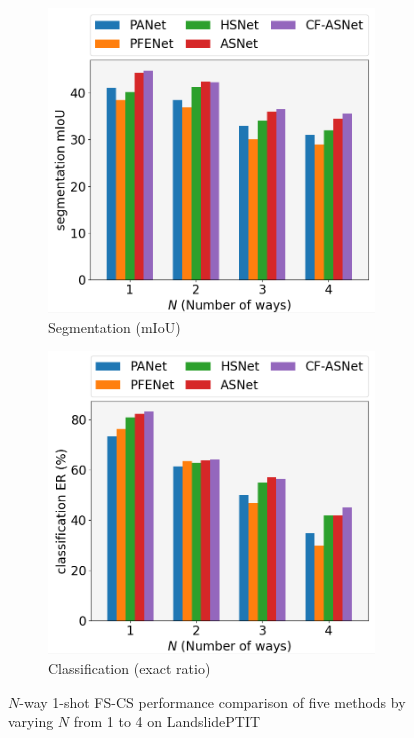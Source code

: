 \documentclass{ieeeaccess}
\begin{document}
\begin{figure}
  \begin{subfigure}{\columnwidth}
  \includegraphics[width=0.95\textwidth]{Fig/4way_iou_2.png}
  \caption{Segmentation (mIoU)}
  \label{fig:compare-way-a}
  \end{subfigure}
  \hfill
  \begin{subfigure}{\columnwidth}
  \includegraphics[width=0.95\textwidth]{Fig/4way_er_2.png}
  \caption{Classification (exact ratio)}
  \label{fig:compare-way-b}
  \end{subfigure}
  \caption{$N$-way 1-shot FS-CS performance comparison of five
methods by varying $N$ from 1 to 4 on LandslidePTIT}
  \label{fig:compare-way}
\end{figure}
\end{document}
